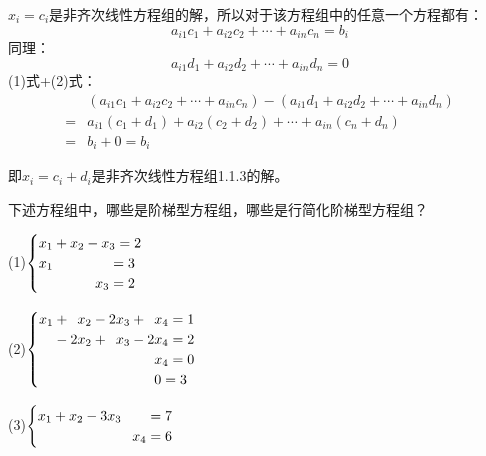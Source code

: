 \documentclass[a4paper]{report}
\begin{document}
\begin{zhengming}
$x_i = c_i$是非齐次线性方程组的解，所以对于该方程组中的任意一个方程都有：
\begin{equation*}
a_{i1}c_{1}+a_{i2}c_{2}+\cdots+a_{in}c_{n}=b_i\tag{1}
\end{equation*}
同理：
\begin{equation*}
a_{i1}d_{1}+a_{i2}d_{2}+\cdots+a_{in}d_{n}=0\tag{2}
\end{equation*}
(1)式+(2)式：
\begin{align*}
&(a_{i1}c_{1}+a_{i2}c_{2}+\cdots+a_{in}c_{n})-(a_{i1}d_{1}+a_{i2}d_{2}+\cdots+a_{in}d_{n})\\
=&a_{i1}(c_{1}+d_{1})+a_{i2}(c_{2}+d_{2})+\cdots+a_{in}(c_{n}+d_{n})\\
=&b_i + 0 =b_i
\end{align*}

即$x_i=c_i+d_i$是非齐次线性方程组1.1.3的解。
\end{zhengming}

\EX 下述方程组中，哪些是阶梯型方程组，哪些是行简化阶梯型方程组？

(1)$
\begin{cases}
x_1+x_2-x_3=2\\
x_1\hphantom{+x_2-x_3}=3\\
\hphantom{x_1+x_2-}x_3=2
\end{cases}
$

(2)$
\begin{cases}
x_1+\hphantom{2} x_2-2x_3+\hphantom{2}x_4=1\\
\hphantom{x_1}-2x_2+\hphantom{2}x_3-2x_4=2\\
\hphantom{x_1-2x_2+2x_3-2}x_4=0\\
\hphantom{x_1-2x_2+2x_3-2}0=3
\end{cases}
$

(3)$
\begin{cases}
x_1 + x_2 - 3x_3 \hphantom{+ x_4}= 7\\
\hphantom{x_1 + x_2 - 3x_3 + }x_4= 6
\end{cases}
$
\end{document}
